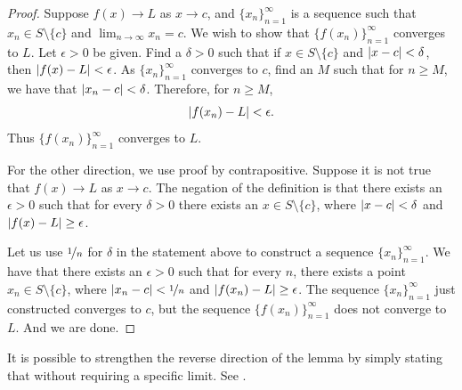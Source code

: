 \begin{proof}
Suppose 
$f(x) \to L$ as $x \to c$, and $\{ x_n \}_{n=1}^\infty$ is a sequence
such that
$x_n \in S \setminus \{c\}$ and
$\lim_{n\to\infty} x_n = c$.
We wish to show that $\bigl\{ f(x_n) \bigr\}_{n=1}^\infty$ converges to $L$.
Let $\epsilon > 0$ be given.  Find a $\delta > 0$ such that
if $x \in S \setminus \{c\}$ and $\left\lvert {x-c} \right\rvert < \delta$, then
$\left\lvert {f(x) - L} \right\rvert < \epsilon$.  As
$\{ x_n \}_{n=1}^\infty$  converges to $c$, find an $M$ such that for $n \geq M$,
we have that $\left\lvert {x_n - c} \right\rvert < \delta$.  Therefore, for $n \geq M$,
\begin{equation*}
\left\lvert {f(x_n) - L} \right\rvert < \epsilon .
\end{equation*}
Thus $\bigl\{ f(x_n) \bigr\}_{n=1}^\infty$ converges to $L$.

For the other direction, we use proof by contrapositive.  Suppose 
it is not true that $f(x) \to L$ as $x \to c$.  The negation of the
definition is that there exists an $\epsilon > 0$ such that for every
$\delta > 0$ there exists an $x \in S \setminus \{c\}$, where
$\left\lvert {x-c} \right\rvert < \delta$
and $\left\lvert {f(x)-L} \right\rvert \geq \epsilon$.

Let us use $\nicefrac{1}{n}$ for $\delta$ in the statement above to
construct a sequence $\{ x_n \}_{n=1}^\infty$.  We have
that there exists an $\epsilon > 0$ such that for every $n$,
there exists a point $x_n \in S \setminus \{c\}$, where
$\left\lvert {x_n-c} \right\rvert < \nicefrac{1}{n}$
and $\left\lvert {f(x_n)-L} \right\rvert \geq \epsilon$.
The sequence $\{ x_n \}_{n=1}^\infty$ just constructed converges to $c$, but
the sequence $\bigl\{ f(x_n) \bigr\}_{n=1}^\infty$ does not converge to $L$.
And we are done.
\end{proof}

It is possible to strengthen the reverse direction of
the lemma by simply stating that
 without requiring a specific limit.
See .

